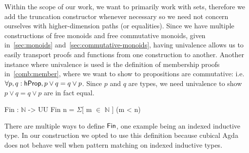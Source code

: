 Within the scope of our work, we want to primarily work with
sets, therefore we add the truncation constructor whenever necessary so we need not concern ourselves
with higher-dimension paths (or equalities). Since we have multiple constructions of free monoids
and free commutative monoids, given in~\ref{sec:monoids} and~\ref{sec:commutative-monoids},
having univalence allows us to easily transport proofs and functions from one construction to another.
Another instance where univalence is used is the definition of membership proofs in~\ref{comb:member},
where we want to show to propositions are commutative: i.e. $\forall p, q: \mathsf{hProp}, p \vee q = q \vee p$.
Since $p$ and $q$ are types, we need univalence to show $p \vee q = q \vee p$ are in fact equal.

\begin{code}
Fin : $\mathbb{N}$ -> UU
Fin n = $\Sigma$[ m $\in$ $\mathbb{N}$ ] (m < n)
\end{code}

There are multiple ways to define $\Fin$, one example being an indexed inductive type.
In our construction we opted to use this definition because cubical Agda does not behave well
when pattern matching on indexed inductive types.

